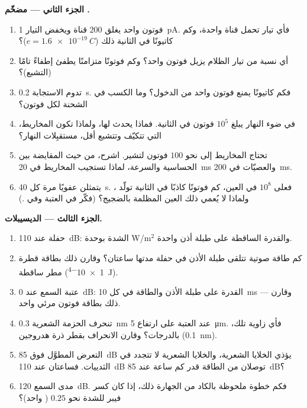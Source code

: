 \begin{problem}
\medskip
\noindent\textbf{الجزء الثاني --- مضخّم .}
\begin{enumerate}[resume]
  \item فوتون واحد يغلق $200$ قناة ويخفض التيار \qty{1}{pA}.
        فأي تيار تحمل قناة واحدة، وكم كاتيونًا في الثانية
        ذلك ($e = \qty{1.6e-19}{C}$)؟
  \item أي نسبة من تيار الظلام يزيل فوتون واحد؟ وكم فوتونًا
        متزامنًا يطفئ  إطفاءً تامًا (التشبع)؟
  \item تدوم الاستجابة \qty{0.2}{s}. فكم كاتيونًا يمنع فوتون
        واحد من الدخول؟ وما الكسب في الشحنة لكل فوتون؟
  \item في ضوء النهار يبلغ  $10^{5}$ فوتون في
        الثانية. فماذا يحدث لها، ولماذا تكون المخاريط، التي
        تتكيّف وتتشبع أقل، مستقبِلات النهار؟
  \item تحتاج المخاريط إلى نحو $100$ فوتون لتشير. اشرح، من
        حيث المقايضة بين الحساسية والسرعة، لماذا تستجيب
        المخاريط في \qty{20}{ms} والعصيّات في \qty{200}{ms}.
  \item يتمثلن  عفويًا مرة كل \qty{40}{s}. فعلى
        $10^{8}$  في العين، كم فوتونًا كاذبًا في الثانية
        تولّد ، ولماذا لا يُعمي ذلك العين المظلمة
        بالضجيج؟ (فكّر في العتبة وفي .)
\end{enumerate}

\medskip
\noindent\textbf{الجزء الثالث --- الديسيبلات.}
\begin{enumerate}[resume]
  \item حفلة عند \qty{110}{dB}: الشدة بوحدة W/m$^{2}$ والقدرة
        الساقطة على طبلة أذن واحدة.
  \item كم طاقة صوتية تتلقى طبلة الأذن في حفلة مدتها
        ساعتان؟ وقارن ذلك بطاقة قطرة مطر ساقطة
        (\qty{1e-4}{J}).
  \item عتبة السمع عند \qty{0}{dB}: القدرة على طبلة الأذن
        والطاقة في كل \qty{10}{ms} --- وقارن ذلك بطاقة فوتون
        مرئي واحد.
  \item تنحرف الحزمة الشعرية \qty{0.3}{nm} عند العتبة على
        ارتفاع \qty{5}{\micro m}. فأي زاوية تلك، بالدرجات؟
        وقارن الانحراف بقطر ذرة هدروجين (\qty{0.1}{nm}).
  \item التعرض المطوَّل فوق \qty{85}{dB} يؤذي الخلايا
        الشعرية، والخلايا الشعرية لا تتجدد في الثدييات.
        فساعتان عند \qty{110}{dB} توصلان من الطاقة قدر كم
        ساعة عند \qty{85}{dB}؟
  \item مدى السمع \qty{120}{dB}. فكم خطوة ملحوظة بالكاد من
        الجهارة ذلك، إذا كان كسر فيبر للشدة نحو $0.25$
        ( واحد)؟
\end{enumerate}


\end{problem}
